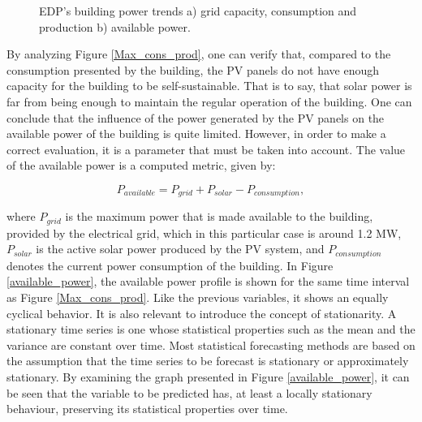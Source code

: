 \begin{figure}[h!]
    \captionsetup[subfigure]{position=b}
    \centering
    \label{fig:ap}
    \caption{EDP's building power trends a) grid capacity, consumption and production b) available power.}
\end{figure}


By analyzing Figure \ref{Max_cons_prod}, one can verify that, compared to the consumption presented by the building, the \ac{PV} panels do not have enough capacity for the building to be self-sustainable. That is to say, that solar power is far from being enough to maintain the regular operation of the building. One can conclude that the influence of the power generated by the \ac{PV} panels on the available power of the building is quite limited. However, in order to make a correct evaluation, it is a parameter that must be taken into account. The value of the available power is a computed metric, given by:

\begin{equation}
   P_{available} = P_{grid} + P_{solar} - P_{consumption},
   \label{available}
\end{equation}

where $P_{grid}$ is the maximum power that is made available to the building, provided by the electrical grid, which in this particular case is around 1.2 MW, $P_{solar}$ is the active solar power produced by the \ac{PV} system, and $P_{consumption}$ denotes the current power consumption of the building. In Figure \ref{available_power}, the available power profile is shown for the same time interval as Figure \ref{Max_cons_prod}. Like the previous variables, it shows an equally cyclical behavior. It is also relevant to introduce the concept of stationarity. A stationary time series is one whose statistical properties such as the mean and the variance are constant over time. Most statistical forecasting methods are based on the assumption that the time series to be forecast is stationary or approximately stationary. By examining the graph presented in Figure \ref{available_power}, it can be seen that the variable to be predicted has, at least a locally stationary behaviour, preserving its statistical properties over time.

